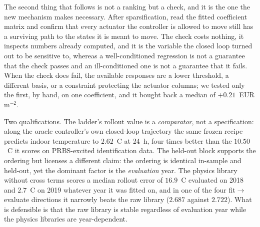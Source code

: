 The second thing that follows is not a ranking but a check, and it is the one the
new mechanism makes necessary. After sparsification, read the fitted coefficient
matrix and confirm that every actuator the controller is allowed to move still has
a surviving path to the states it is meant to move. The check costs nothing, it inspects numbers already computed, and it is the variable the closed loop turned
out to be sensitive to, whereas a well-conditioned regression is not a guarantee
that the check passes and an ill-conditioned one is not a guarantee that it fails.
When the check does fail, the available responses are a lower threshold, a
different basis, or a constraint protecting the actuator columns; we tested only
the first, by hand, on one coefficient, and it bought back a median of
$+0.21$~EUR\,m$^{-2}$.

Two qualifications. The ladder's rollout value is a \emph{comparator}, not a
specification: along the oracle controller's own closed-loop trajectory the same
frozen recipe predicts indoor temperature to $2.62$~\textdegree C at 24~h, four
times better than the $10.50$~\textdegree C it scores on PRBS-excited
identification data.
The held-out block supports the ordering but licenses a different claim: the
ordering is identical in-sample and held-out, yet the dominant factor is the
\emph{evaluation} year. The physics library without cross terms scores a median
rollout error of $16.9$~\textdegree C evaluated on 2018
and $2.7$~\textdegree C on 2019 whatever year it was fitted on, and in one of
the four fit$\rightarrow$evaluate directions it narrowly beats the raw library
($2.687$ against $2.722$). What is defensible is that the raw library is stable
regardless of evaluation year while the physics libraries are year-dependent.

